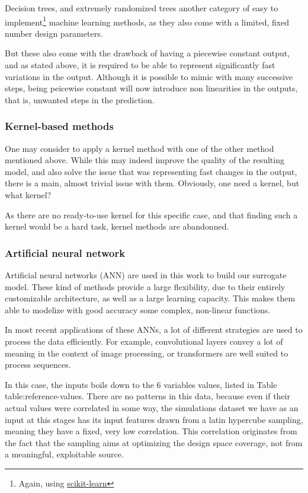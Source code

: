 Decision trees, and extremely randomized trees \cite{extremely-randomized-trees} another category of easy to implement\footnote{Again, using \href{https://scikit-learn.org/stable/modules/ensemble.html\#forests-of-randomized-trees}{scikit-learn}} machine learning methods, as they also come with a limited, fixed number design parameters.

But these also come with the drawback of having a piecewise constant output, and as stated above, it is required to be able to represent significantly fast variations in the output. Although it is possible to mimic with many successive steps, being peicewise constant will now introduce non linearities in the outputs, that is, unwanted steps in the prediction.

\subsubsection{Kernel-based methods\label{section:kernel-methods}}

One may consider to apply a kernel method with one of the other method mentioned above. While this may indeed improve the quality of the resulting model, and also solve the issue that was representing fast changes in the output, there is a main, almost trivial issue with them. Obviously, one need a kernel, but what kernel?

As there are no ready-to-use kernel for this specific case, and that finding such a kernel would be a hard task, kernel methods are abandonned.

\subsubsection{Artificial neural network}

Artificial neural networks (ANN) are used in this work to build our surrogate model. These kind of methods provide a large flexibility, due to their entirely customizable architecture, as well as a large learning capacity. This makes them able to modelize with good accuracy some complex, non-linear functions.

In most recent applications of these ANNs, a lot of different strategies are used to process the data efficiently. For example, convolutional layers convey a lot of meaning in the context of image processing, or transformers are well suited to process sequences\cite{deep-learning-class}.

In this case, the inputs boils down to the 6 variables values, listed in Table {table:reference-values}. There are no patterns in this data, because even if their actual values were correlated in some way, the simulations dataset we have as an input at this stages has its input features drawn from a latin hypercube sampling, meaning they have a fixed, very low correlation. This correlation originates from the fact that the sampling aims at optimizing the design space coverage, not from a meaningful, exploitable source.

